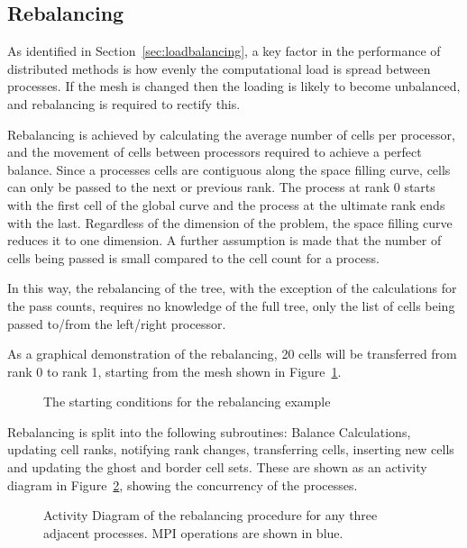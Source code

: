 \documentclass[twoside]{IIBproject}
\numberwithin{figure}{section}
\begin{document}


    \subsection{Rebalancing} %
        \label{sec:rebalancing}

        As identified in Section~\ref{sec:loadbalancing}, a key factor in the performance of distributed methods is how evenly the computational load is spread between processes. If the mesh is changed then the loading is likely to become unbalanced, and rebalancing is required to rectify this. 

        Rebalancing is achieved by calculating the average number of cells per processor, and the movement of cells between processors required to achieve a perfect balance. Since a processes cells are contiguous along the space filling curve, cells can only be passed to the next or previous rank. The process at rank 0 starts with the first cell of the global curve and the process at the ultimate rank ends with the last. Regardless of the dimension of the problem, the space filling curve reduces it to one dimension. A further assumption is made that the number of cells being passed is small compared to the cell count for a process.

        In this way, the rebalancing of the tree, with the exception of the calculations for the pass counts, requires no knowledge of the full tree, only the list of cells being passed to/from the left/right processor.

        As a graphical demonstration of the rebalancing, 20 cells will be transferred from rank 0 to rank 1, starting from the mesh shown in Figure~\ref{fig:rebalance-init}.

        \begin{figure}[!htbp]
            
            \caption{The starting conditions for the rebalancing example}
            \label{fig:rebalance-init}
        \end{figure}

        Rebalancing is split into the following subroutines: Balance Calculations, updating cell ranks, notifying rank changes, transferring cells, inserting new cells and updating the ghost and border cell sets. These are shown as an activity diagram in Figure~\ref{fig:rebalance-overview}, showing the concurrency of the processes.

        \begin{figure}[!htbp]
            
            \caption{Activity Diagram of the rebalancing procedure for any three adjacent processes. MPI operations are shown in blue.}
            \label{fig:rebalance-overview}
        \end{figure}
\end{document}
